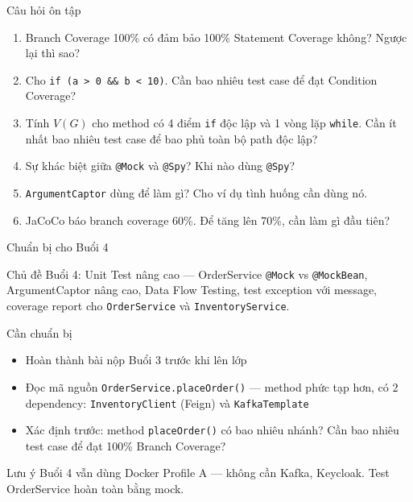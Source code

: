 \documentclass[aspectratio=169,12pt]{beamer}
\begin{document}
\begin{frame}[shrink=12]{Câu hỏi ôn tập}
  \begin{enumerate}
    \item Branch Coverage 100\% có đảm bảo 100\% Statement Coverage không?
      Ngược lại thì sao?

    \item Cho \texttt{if (a > 0 \&\& b < 10)}. Cần bao nhiêu test case
      để đạt Condition Coverage?

    \item Tính $V(G)$ cho method có 4 điểm \texttt{if} độc lập và
      1 vòng lặp \texttt{while}. Cần ít nhất bao nhiêu test case để
      bao phủ toàn bộ path độc lập?

    \item Sự khác biệt giữa \texttt{@Mock} và \texttt{@Spy}?
      Khi nào dùng \texttt{@Spy}?

    \item \texttt{ArgumentCaptor} dùng để làm gì?
      Cho ví dụ tình huống cần dùng nó.

    \item JaCoCo báo branch coverage 60\%. Để tăng lên 70\%,
      cần làm gì đầu tiên?
  \end{enumerate}
\end{frame}

\begin{frame}[shrink=16]{Chuẩn bị cho Buổi 4}
  \begin{block}{Chủ đề Buổi 4: Unit Test nâng cao --- OrderService}
    \texttt{@Mock} vs \texttt{@MockBean}, ArgumentCaptor nâng cao,
    Data Flow Testing, test exception với message, coverage report
    cho \texttt{OrderService} và \texttt{InventoryService}.
  \end{block}

  \vspace{0.5em}
  \begin{block}{Cần chuẩn bị}
    \begin{itemize}
      \item Hoàn thành bài nộp Buổi 3 trước khi lên lớp
      \item Đọc mã nguồn \texttt{OrderService.placeOrder()} --- method phức tạp hơn,
            có 2 dependency: \texttt{InventoryClient} (Feign) và \texttt{KafkaTemplate}
      \item Xác định trước: method \texttt{placeOrder()} có bao nhiêu nhánh?
            Cần bao nhiêu test case để đạt 100\% Branch Coverage?
    \end{itemize}
  \end{block}

  \begin{alertblock}{Lưu ý}
    Buổi 4 vẫn dùng Docker Profile A --- không cần Kafka, Keycloak.
    Test OrderService hoàn toàn bằng mock.
  \end{alertblock}
\end{frame}
\end{document}
